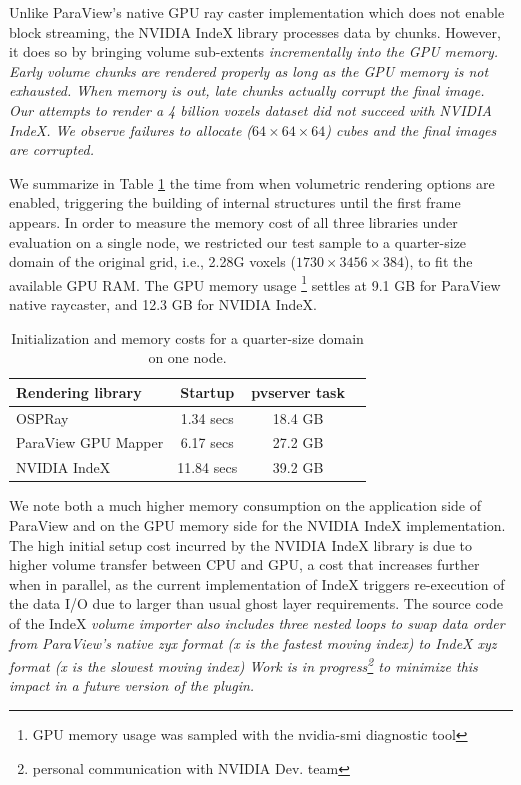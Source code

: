 \documentclass[5p,times]{elsarticle}
\begin{document}
Unlike ParaView's native GPU ray caster implementation which does not enable block
streaming, the NVIDIA IndeX library processes data by chunks. However, it does so
by bringing volume sub-extents \it{incrementally} \rm into the GPU memory.
Early volume chunks are rendered properly as long as the GPU memory is not exhausted.
When memory is out, late chunks actually corrupt the final image. Our attempts to
render a 4 billion voxels dataset did not succeed with NVIDIA IndeX. We observe failures
to allocate ($ 64 \times 64 \times 64 $) cubes and the final images are corrupted.

We summarize in Table \ref{tab:firstframe-tab} the time from when volumetric rendering options
are enabled, triggering the building of internal structures until the first frame appears.
In order to measure the memory cost of all three libraries under evaluation on a single node,
we restricted our test sample to a quarter-size domain of the original grid, i.e., 2.28G voxels
($ 1730 \times 3456 \times 384 $), to fit the available GPU RAM. The GPU memory
usage \footnote{GPU memory usage was sampled with the nvidia-smi diagnostic tool}
settles at 9.1 GB for ParaView native raycaster, and 12.3 GB for NVIDIA IndeX. 

\begin{table}[htb]
  \centering
  \caption{
    Initialization and memory costs for a quarter-size domain on one node.
  }
  \label{tab:firstframe-tab}

  \begin{tabular}{lccc}
    \hline
    Rendering library & Startup & pvserver task\\
    \hline
    OSPRay & 1.34 secs &  18.4 GB \\
    ParaView GPU Mapper & 6.17 secs &  27.2 GB \\
    NVIDIA IndeX & 11.84 secs &  39.2 GB\\
    \hline

  \end{tabular}
\end{table}

We note both a much higher memory consumption on the application side of ParaView and
on the GPU memory side for the NVIDIA IndeX implementation. The high initial setup cost incurred by the NVIDIA IndeX library is due to higher
volume transfer between CPU and GPU, a cost that increases further when in parallel,
as the current implementation of IndeX triggers re-execution of the data I/O due
to larger than usual ghost layer requirements. The source code of the IndeX \it{volume importer} \rm also includes three nested loops to swap data order from ParaView's native \it{zyx} \rm format (x is the fastest moving index) to IndeX \it{xyz} \rm format (x is the slowest moving index)  Work is in progress\footnote{personal communication with NVIDIA Dev. team} to minimize this impact in a future version of the plugin.
\end{document}
